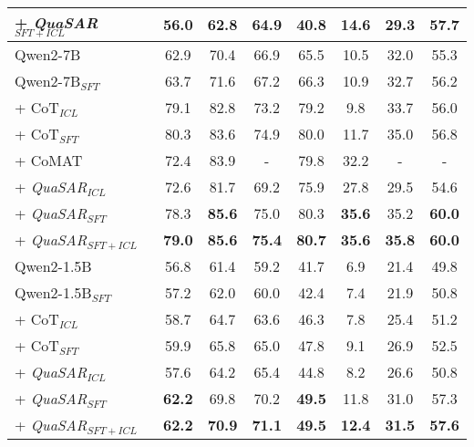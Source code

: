 \documentclass[11pt]{article}
\newcommand{\QuaSAR}{\emph{QuaSAR}\xspace}
\begin{document}
\begin{table*}[]
\begin{tabular}{lccccccc}
+ \QuaSAR$_{SFT+ICL}$ & \textbf{56.0} & \textbf{62.8} & \textbf{64.9} & \textbf{40.8} & \textbf{14.6} & 29.3 & \textbf{57.7} \\ 

\midrule


Qwen2-7B & 62.9 & 70.4 & 66.9 & 65.5 & 10.5 & 32.0 & 55.3 \\
Qwen2-7B$_{SFT}$ & 63.7 & 71.6 & 67.2 & 66.3 & 10.9 & 32.7 & 56.2 \\

+ CoT$_{ICL}$ & 79.1 & 82.8 & 73.2 & 79.2 & 9.8 & 33.7 & 56.0 \\

+ CoT$_{SFT}$ & 80.3 & 83.6 & 74.9 & 80.0 & 11.7 & 35.0 & 56.8 \\

+ CoMAT \cite{leang2024comatchainmathematicallyannotated} & 72.4 & 83.9 & - & 79.8 & 32.2 & - & - \\

+ \QuaSAR$_{ICL}$ & 72.6 & 81.7 & 69.2 & 75.9 & 27.8 & 29.5 & 54.6 \\ 

+ \QuaSAR$_{SFT}$ & 
78.3 & \textbf{85.6} & 75.0 & 80.3 & \textbf{35.6} & 35.2 & \textbf{60.0} \\ 

+ \QuaSAR$_{SFT+ICL}$ & 
\textbf{79.0} & \textbf{85.6} & \textbf{75.4} & \textbf{80.7} & \textbf{35.6} & \textbf{35.8} & \textbf{60.0} \\ 

\midrule

Qwen2-1.5B & 56.8 & 61.4 & 59.2 & 41.7 & 6.9 & 21.4 & 49.8 \\

Qwen2-1.5B$_{SFT}$ & 57.2 & 62.0 & 60.0 & 42.4 & 7.4 & 21.9 & 50.8 \\

+ CoT$_{ICL}$ & 58.7 & 64.7 & 63.6 & 46.3 & 7.8 & 25.4 & 51.2 \\

+ CoT$_{SFT}$ & 59.9 & 65.8 & 65.0 & 47.8 & 9.1 & 26.9 & 52.5 \\

+ \QuaSAR$_{ICL}$ & 57.6 & 64.2 & 65.4 & 44.8 & 8.2 & 26.6 & 50.8 \\ 

+ \QuaSAR$_{SFT}$ & \textbf{62.2} & 69.8 & 70.2 & \textbf{49.5} & 11.8 & 31.0 & 57.3 \\ 

+ \QuaSAR$_{SFT+ICL}$ & \textbf{62.2} & \textbf{70.9} & \textbf{71.1} & \textbf{49.5} & \textbf{12.4} & \textbf{31.5} & \textbf{57.6} \\ 

\bottomrule
\end{tabular}
\caption{Performance comparison using \QuaSAR, CoT \cite{kojima2022large}, FLARE \cite{arakelyan2024flarefaithfullogicaidedreasoning} and, CoMAT \cite{leang2024comatchainmathematicallyannotated}as in-context learning strategy (denoted as ${ICL}$), annotation strategy for delivering demonstration to supervised fine-tune LLMs (denoted as ${SFT}$) and in-context learning plus tuning (denoted as ${ICL+SFT}$).}
\label{tab:results_tuning_SiC_complete}
\end{table*}
\end{document}
